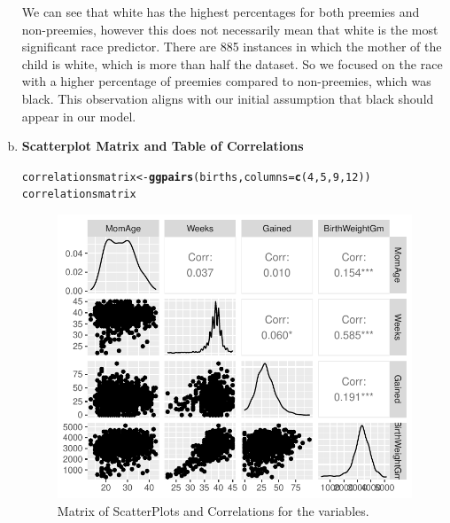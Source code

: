 \documentclass{article}\usepackage[]{graphicx}\usepackage[]{xcolor}
\makeatletter
\def\maxwidth{ %
  \ifdim\Gin@nat@width>\linewidth
    \linewidth
  \else
    \Gin@nat@width
  \fi
}
\newcommand{\hlnum}[1]{\textcolor[rgb]{0.686,0.059,0.569}{#1}}%
\newcommand{\hlstd}[1]{\textcolor[rgb]{0.345,0.345,0.345}{#1}}%
\newcommand{\hlkwb}[1]{\textcolor[rgb]{0.69,0.353,0.396}{#1}}%
\newcommand{\hlkwc}[1]{\textcolor[rgb]{0.333,0.667,0.333}{#1}}%
\newcommand{\hlkwd}[1]{\textcolor[rgb]{0.737,0.353,0.396}{\textbf{#1}}}%
\newenvironment{kframe}{%
 \def\at@end@of@kframe{}%
 \ifinner\ifhmode%
  \def\at@end@of@kframe{\end{minipage}}%
  \begin{minipage}{\columnwidth}%
 \fi\fi%
 \def\FrameCommand##1{\hskip\@totalleftmargin \hskip-\fboxsep
 \colorbox{shadecolor}{##1}\hskip-\fboxsep
     \hskip-\linewidth \hskip-\@totalleftmargin \hskip\columnwidth}%
 \MakeFramed {\advance\hsize-\width
   \@totalleftmargin\z@ \linewidth\hsize
   \@setminipage}}%
 {\par\unskip\endMakeFramed%
 \at@end@of@kframe}
\newenvironment{knitrout}{}{} %
\makeatother
\begin{document}
\begin{enumerate}[a.]
 We can see that white has the highest percentages for both preemies and non-preemies, however this does not necessarily mean that white is the most significant race predictor. There are 885 instances in which the mother of the child is white, which is more than half the dataset. So we focused on the race with a higher percentage of preemies compared to non-preemies, which was black. This observation aligns with our initial assumption that black should appear in our model. 

\item\textbf{Scatterplot Matrix and Table of Correlations}
\begin{knitrout}
\color{fgcolor}\begin{kframe}
\begin{alltt}
\hlstd{correlationsmatrix} \hlkwb{<-} \hlkwd{ggpairs}\hlstd{(births,} \hlkwc{columns} \hlstd{=} \hlkwd{c}\hlstd{(}\hlnum{4}\hlstd{,}\hlnum{5}\hlstd{,}\hlnum{9}\hlstd{,}\hlnum{12}\hlstd{))}
\hlstd{correlationsmatrix}
\end{alltt}
\end{kframe}
\end{knitrout}

\begin{figure}[H]
\centering
\begin{knitrout}
\color{fgcolor}
\includegraphics[width=\maxwidth]{figure/unnamed-chunk-7-1} 
\end{knitrout}
\caption{Matrix of ScatterPlots and Correlations for the variables.}
\label{CorrelationSummary}
\end{figure}


\end{enumerate}
\end{document}
